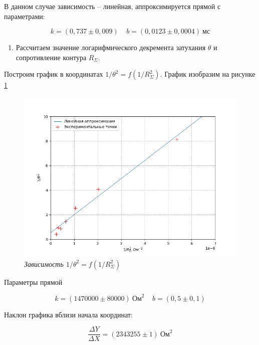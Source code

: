 \documentclass[a4paper,12pt]{article}
\begin{document}
В данном случае зависимость -- линейная, аппроксимируется прямой с параметрами:

\begin{equation*}
    k = (0,737 \pm 0,009) \ \ \ \ \ b = (0,0123 \pm 0,0004) \ \text{мс}
\end{equation*}

\FloatBarrier

\begin{enumerate}[resume]
    \item Рассчитаем значение логарифмического декремента затухания $\theta$ и сопротивление контура $R_\Sigma$.
\end{enumerate}

Построим график в координатах $1/ \theta^2 = f \left( 1/R_\Sigma^2 \right)$. График изобразим на рисунке \ref{graph:2}


\begin{figure}[!ht]
        \centering
	\includegraphics[width=1.0\textwidth]{graph-2.png}
	\caption{\textit{Зависимость $1/ \theta^2 = f \left( 1/R_\Sigma^2 \right)$}}
	\label{graph:2}
\end{figure}

\FloatBarrier

Параметры прямой 

\begin{equation*}
    k = (1470000 \pm 80000) \ \text{Ом}^2 \ \ \ \ \ b = (0,5 \pm 0,1)
\end{equation*}

Наклон графика вблизи начала координат:

\begin{equation*}
    \frac{\Delta Y}{\Delta X} = (2343255 \pm 1) \ \text{Ом}^2
\end{equation*}
\end{document}
